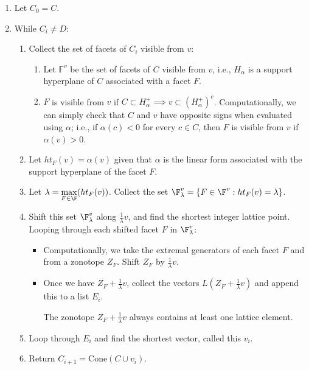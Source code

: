 \documentclass{TC}
\begin{document}
\begin{enumerate}

\item Let $C_0 = C$.
\item While $C_i \neq D$:

\begin{enumerate}
\item Collect the set of facets of $C_i$  visible from $v$:
\begin{enumerate}
\item Let $\mathbb F^v$ be the set of facets of $C$ visible from $v$, i.e., $H_{\alpha}$ is a support hyperplane of $C$ associated with a facet $F$.
\item  $F$ is visible from $v$ if $C \subset H_{\alpha}^+ \implies v \subset (H_{\alpha}^+)^c$. Computationally, we can simply check that $C$ and $v$ have opposite signs when evaluated using $\alpha$; i.e., if $\alpha(c) < 0 $ for every $c \in C$, then $F$ is visible from $v$ if $\alpha(v) > 0$.
 
\end{enumerate}
\item Let $ht_{F}(v) = \alpha(v)$ given that $\alpha$ is the linear form associated with the support hyperplane of the facet $F$.
\item Let $\lambda = \displaystyle\max_{F \in \F}(ht_{F}(v))$. Collect the set $\F^v_\lambda = \{F \in \F^v: ht_{F}(v) = \lambda\}$. 
\item Shift this set $\F^v_{\lambda}$ along $\frac{1}{\lambda} v$, and find the shortest integer lattice point. Looping through each shifted facet $F$ in $\F^v_{\lambda}$:
	\begin{itemize}
	\item Computationally, we take the extremal generators of each facet $F$ and from a zonotope $Z_F$. Shift $Z_F$ by $\frac{1}{\lambda}v$.
	\item Once we have $Z_F + \frac{1}{\lambda}v$, collect the vectors $L(Z_F+\frac{1}{\lambda}v )$ and append this to a list $E_i$. 
\begin{remark}\label{zonotopelattice}
The zonotope $Z_F + \frac{1}{\lambda}v$ always contains at least one lattice element.
\end{remark}
	\end{itemize}
\item Loop through $E_i$ and find the shortest vector, called this $v_i$.
\item Return $C_{i+1} = \mathrm{Cone}(C \cup v_i)$. 
\end{enumerate}
\end{enumerate}
\end{document}
